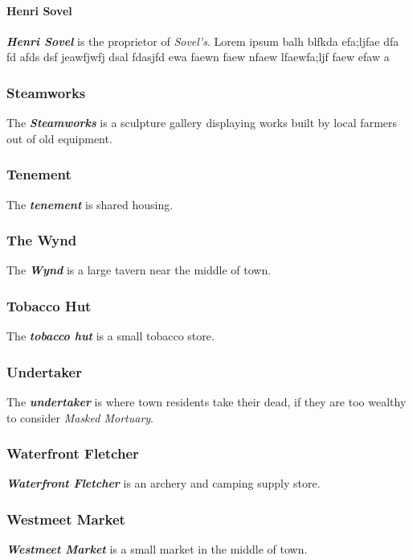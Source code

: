 \documentclass[11pt]{teraum_adventure}
\begin{document}
\paragraph{Henri Sovel}
\label{sec:org2a0bdea}
\textbf{\emph{Henri Sovel}} is the proprietor of \emph{Sovel's}. Lorem ipsum balh
blfkda efa;ljfae dfa fd afds dsf jeawfjwfj dsal fdasjfd ewa faewn faew
nfaew lfaewfa;ljf faew efaw a
\subsubsection*{Steamworks}
\label{sec:org405c369}
The \textbf{\emph{Steamworks}} is a sculpture gallery displaying works built by
local farmers out of old equipment.
\subsubsection*{Tenement}
\label{sec:orgaab59e8}
The \textbf{\emph{tenement}} is shared housing.
\subsubsection*{The Wynd}
\label{sec:orgd52367c}
The \textbf{\emph{Wynd}} is a large tavern near the middle of town.
\subsubsection*{Tobacco Hut}
\label{sec:org72c5a73}
The \textbf{\emph{tobacco hut}} is a small tobacco store.
\subsubsection*{Undertaker}
\label{sec:orge318d7e}
The \textbf{\emph{undertaker}} is where town residents take their dead, if they
are too wealthy to consider \emph{Masked Mortuary}.
\subsubsection*{Waterfront Fletcher}
\label{sec:org8b9c770}
\textbf{\emph{Waterfront Fletcher}} is an archery and camping supply store.
\subsubsection*{Westmeet Market}
\label{sec:org11c4314}
\textbf{\emph{Westmeet Market}} is a small market in the middle of town.
\end{document}
